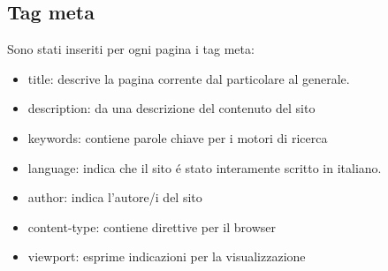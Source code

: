 \documentclass[12pt]{article}
\begin{document}
			
			\newpage
			\subsection{Tag meta}
			
	 Sono stati inseriti per ogni pagina i tag meta:
	 		\begin{itemize}
				\item title: descrive la pagina corrente dal particolare al generale.
				\item description: da una descrizione del contenuto del sito
				\item keywords: contiene parole chiave per i motori di ricerca
				\item language: indica che il sito \'e stato interamente scritto in italiano.
				\item author: indica l'autore/i del sito
				\item content-type: contiene direttive per il browser
				\item viewport: esprime indicazioni per la visualizzazione
			\end{itemize}
\end{document}
